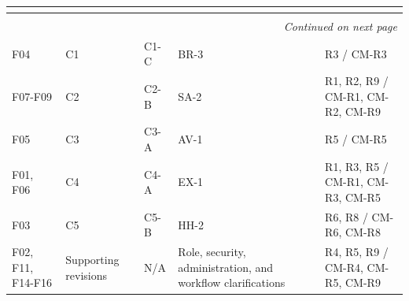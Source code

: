 \documentclass[11pt,a4paper]{article}
\renewcommand{\arraystretch}{1.15}
\begin{document}
\begin{landscape}
\begin{center}
\scriptsize
\setlength{\tabcolsep}{2.5pt}
\renewcommand{\arraystretch}{1.18}
\begin{longtable}{|p{3.4cm}|p{2.4cm}|p{3.2cm}|p{4.3cm}|p{9.0cm}|}
\hline
\rowcolor{headerblue} \textbf{\color{white}{Inspection findings}} & \textbf{\color{white}{Conflict}} & \textbf{\color{white}{Selected resolution}} & \textbf{\color{white}{Revised requirement}} & \textbf{\color{white}{Risk/countermeasure trace}} \\ \hline
\endfirsthead
\hline
\rowcolor{headerblue} \textbf{\color{white}{Inspection findings}} & \textbf{\color{white}{Conflict}} & \textbf{\color{white}{Selected resolution}} & \textbf{\color{white}{Revised requirement}} & \textbf{\color{white}{Risk/countermeasure trace}} \\ \hline
\endhead
\hline
\multicolumn{5}{r}{\small\itshape Continued on next page}\\
\endfoot
\hline
\endlastfoot
F04 & C1 & C1-C & BR-3 & R3 / CM-R3 \\ \hline
F07-F09 & C2 & C2-B & SA-2 & R1, R2, R9 / CM-R1, CM-R2, CM-R9 \\ \hline
F05 & C3 & C3-A & AV-1 & R5 / CM-R5 \\ \hline
F01, F06 & C4 & C4-A & EX-1 & R1, R3, R5 / CM-R1, CM-R3, CM-R5 \\ \hline
F03 & C5 & C5-B & HH-2 & R6, R8 / CM-R6, CM-R8 \\ \hline
F02, F11, F14-F16 & Supporting revisions & N/A & Role, security, administration, and workflow clarifications & R4, R5, R9 / CM-R4, CM-R5, CM-R9 \\ \hline
\end{longtable}
\end{center}
\end{landscape}
\end{document}
